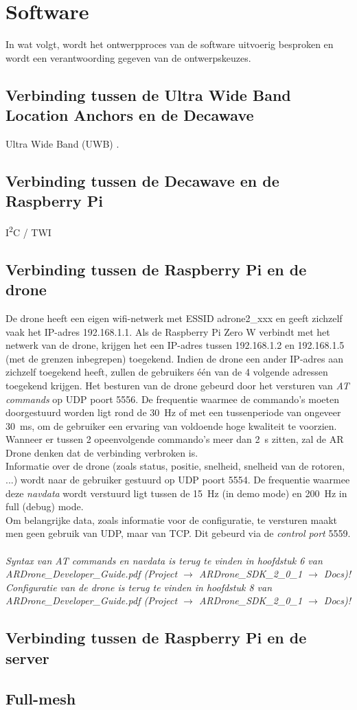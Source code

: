\chapter{Software}
In wat volgt, wordt het ontwerpproces van de software uitvoerig besproken en wordt een verantwoording gegeven van de ontwerpskeuzes.

\section{Verbinding tussen de Ultra Wide Band Location Anchors en de Decawave} \label{sec:uwb_decawave}
Ultra Wide Band (UWB) \cite{alarifi2016ultra}.

\section{Verbinding tussen de Decawave en de Raspberry Pi} \label{sec:decawave_raspberry}
I\textsuperscript{2}C / TWI

\section{Verbinding tussen de Raspberry Pi en de drone} \label{sec:raspberry_drone}
De drone heeft een eigen wifi-netwerk met ESSID adrone2\_xxx en geeft zichzelf vaak het IP-adres 192.168.1.1.
Als de Raspberry Pi Zero W verbindt met het netwerk van de drone, krijgen het een IP-adres tussen 192.168.1.2 en 192.168.1.5 (met de grenzen inbegrepen) toegekend.
Indien de drone een ander IP-adres aan zichzelf toegekend heeft, zullen de gebruikers één van de 4 volgende adressen toegekend krijgen.
Het besturen van de drone gebeurd door het versturen van \textit{AT commands} op UDP poort 5556.
De frequentie waarmee de commando's moeten doorgestuurd worden ligt rond de \SI{30}{\Hz} of met een tussenperiode van ongeveer \SI{30}{\ms}, om de gebruiker een ervaring van voldoende hoge kwaliteit te voorzien.
Wanneer er tussen 2 opeenvolgende commando's meer dan \SI{2}{\s} zitten, zal de AR Drone denken dat de verbinding verbroken is.\\
Informatie over de drone (zoals status, positie, snelheid, snelheid van de rotoren, ...) wordt naar de gebruiker gestuurd op UDP poort 5554.
De frequentie waarmee deze \textit{navdata} wordt verstuurd ligt tussen de \SI{15}{\Hz} (in demo mode) en \SI{200}{\Hz} in full (debug) mode.\\
Om belangrijke data, zoals informatie voor de configuratie, te versturen maakt men geen gebruik van UDP, maar van TCP.
Dit gebeurd via de \textit{control port} 5559.\\
\\
\textit{Syntax van AT commands en navdata is terug te vinden in hoofdstuk 6 van ARDrone\_Developer\_Guide.pdf (Project $\to$ ARDrone\_SDK\_2\_0\_1 $\to$ Docs)!}\\
\textit{Configuratie van de drone is terug te vinden in hoofdstuk 8 van ARDrone\_Developer\_Guide.pdf (Project $\to$ ARDrone\_SDK\_2\_0\_1 $\to$ Docs)!}

\section{Verbinding tussen de Raspberry Pi en de server} \label{sec:raspberry_server}


\section{Full-mesh} \label{sec:full_mesh}
